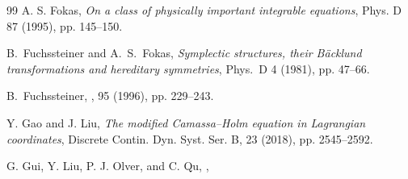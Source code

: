 \documentclass[11pt]{article}
\numberwithin{equation}{section}
\begin{document}
\begin{thebibliography}{99}
A. S. Fokas, {\em On a class of physically important integrable equations}, Phys. D 87 (1995), pp. 145--150.

B.\ Fuchssteiner and A.\ S.\ Fokas,
{\em Symplectic structures, their B\"acklund transformations and hereditary symmetries},
 {Phys.\ D} 4 (1981), pp. 47--66.


B.~Fuchssteiner,
,
 95 (1996), pp. 229--243.

Y. Gao and J. Liu, {\em The modified Camassa–Holm equation in Lagrangian coordinates}, Discrete Contin. Dyn.
Syst. Ser. B, 23 (2018), pp. 2545--2592.




G. Gui, Y. Liu, P. J. Olver, and C. Qu,
,








\end{thebibliography}
\end{document}

